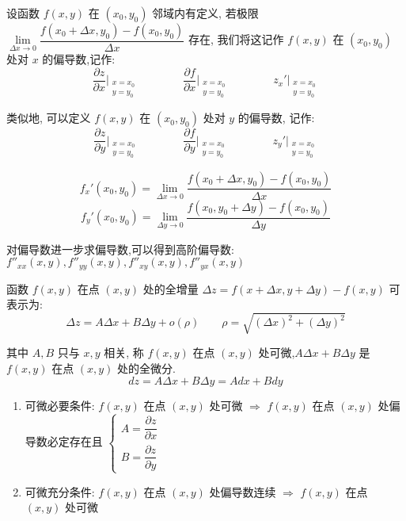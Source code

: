 \begin{definition}[偏导数]
	
	设函数 $f(x,y)$ 在 $(x_{0},y_{0})$ 邻域内有定义, 若极限 $\lim\limits_{\Delta x\to 0}\dfrac{f(x_{0}+\Delta x,y_{0})-f(x_{0},y_{0})}{\Delta x}$ 存在,
	我们将这记作 $f(x,y)$ 在 $(x_{0},y_{0})$ 处对 $x$ 的偏导数,记作: 
	$$\dfrac{\partial z}{\partial x}\big|_{\substack{x=x_{0}\\y=y_{0}}}\qquad\qquad 
	\dfrac{\partial f}{\partial x}\big|_{\substack{x=x_{0}\\y=y_{0}}}\qquad\qquad
	z_{x}'\big|_{\substack{x=x_{0}\\y=y_{0}}}$$

	类似地, 可以定义 $f(x,y)$ 在 $(x_{0},y_{0})$ 处对 $y$ 的偏导数, 记作:
	$$\dfrac{\partial z}{\partial y}\big|_{\substack{x=x_{0}\\y=y_{0}}}\qquad\qquad
	\dfrac{\partial f}{\partial y}\big|_{\substack{x=x_{0}\\y=y_{0}}}\qquad\qquad
	z_{y}'\big|_{\substack{x=x_{0}\\y=y_{0}}}$$

	$$f_{x}'(x_{0},y_{0}) = \lim\limits_{\Delta x\to 0}\dfrac{f(x_{0}+\Delta x,y_{0})-f(x_{0},y_{0})}{\Delta x}$$
	$$f_{y}'(x_{0},y_{0}) = \lim\limits_{\Delta y\to 0}\dfrac{f(x_{0},y_{0}+\Delta y)-f(x_{0},y_{0})}{\Delta y}$$
	
	对偏导数进一步求偏导数,可以得到高阶偏导数: $f''_{xx}(x,y),f''_{yy}(x,y),f''_{xy}(x,y),f''_{yx}(x,y)$
\end{definition}
\begin{definition}[可微]
	
	函数 $f(x,y)$ 在点 $(x,y)$ 处的全增量 $\Delta z=f(x+\Delta x,y+\Delta y)-f(x,y)$ 可表示为: 
	$$\Delta z=A\Delta x+B\Delta y+o(\rho)\qquad \rho=\sqrt{(\Delta x)^2+(\Delta y)^2}$$
	
	其中 $A,B$ 只与 $x,y$ 相关, 称 $f(x,y)$ 在点 $(x,y)$ 处可微,$A\Delta x+B\Delta y$ 是 $f(x,y)$ 在点 $(x,y)$ 处的全微分.
	$$dz=A\Delta x+B\Delta y=Adx+Bdy$$
	\begin{enumerate}
		\item 可微必要条件: $f(x,y)$ 在点 $(x,y)$ 处可微 $\Rightarrow$ $f(x,y)$ 在点 $(x,y)$ 处偏导数必定存在且 $\begin{cases} A = \dfrac{\partial z}{\partial x}  \\ B = \dfrac{\partial z}{\partial y}\end{cases}$
		\item 可微充分条件: $f(x,y)$ 在点 $(x,y)$ 处偏导数连续 $\Rightarrow$ $f(x,y)$ 在点 $(x,y)$ 处可微
	\end{enumerate}
\end{definition}
